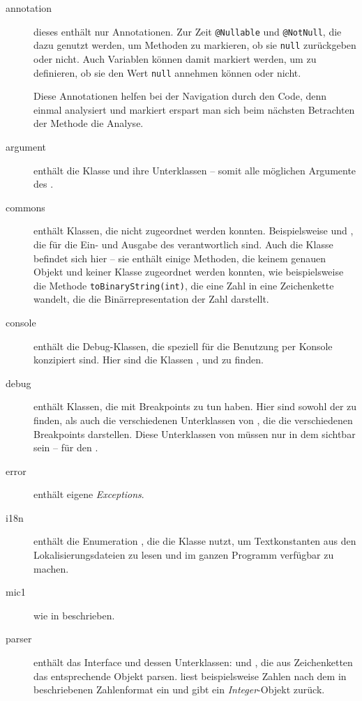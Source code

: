 \begin{description}
\item[annotation] dieses \package enthält nur Annotationen. Zur Zeit \texttt{@Nullable} und \texttt{@NotNull}, die dazu genutzt werden, um Methoden zu markieren, ob sie \texttt{null} zurückgeben oder nicht. Auch Variablen können damit markiert werden, um zu definieren, ob sie den Wert \texttt{null} annehmen können oder nicht.

Diese Annotationen helfen bei der Navigation durch den Code, denn einmal analysiert und markiert erspart man sich beim nächsten Betrachten der Methode die Analyse.
\item[argument] enthält die Klasse  und ihre Unterklassen -- somit alle möglichen Argumente des \md.
\item[commons] enthält Klassen, die nicht zugeordnet werden konnten. Beispielsweise  und , die für die Ein- und Ausgabe des \md verantwortlich sind. Auch die Klasse  befindet sich hier -- sie enthält einige Methoden, die keinem genauen Objekt und keiner Klasse zugeordnet werden konnten, wie beispielsweise die Methode \texttt{toBinaryString(int)}, die eine Zahl in eine Zeichenkette wandelt, die die Binärrepresentation der Zahl darstellt.
\item[console] enthält die Debug-Klassen, die speziell für die Benutzung per Konsole konzipiert sind. Hier sind die Klassen ,  und  zu finden.
\item[debug] enthält Klassen, die mit Breakpoints zu tun haben. Hier sind sowohl der  zu finden, als auch die verschiedenen Unterklassen von , die die verschiedenen Breakpoints darstellen. Diese Unterklassen von  müssen nur in dem \package sichtbar sein -- für den .
\item[error] enthält eigene \emph{Exceptions}.
\item[i18n] enthält die Enumeration , die die Klasse  nutzt, um Textkonstanten aus den Lokalisierungsdateien zu lesen und im ganzen Programm verfügbar zu machen.
\item[mic1] wie in  beschrieben.
\item[parser] enthält das Interface  und dessen Unterklassen:  und , die aus Zeichenketten das entsprechende Objekt parsen.  liest beispielsweise Zahlen nach dem in  beschriebenen Zahlenformat ein und gibt ein \emph{Integer}-Objekt zurück.

\end{description}
